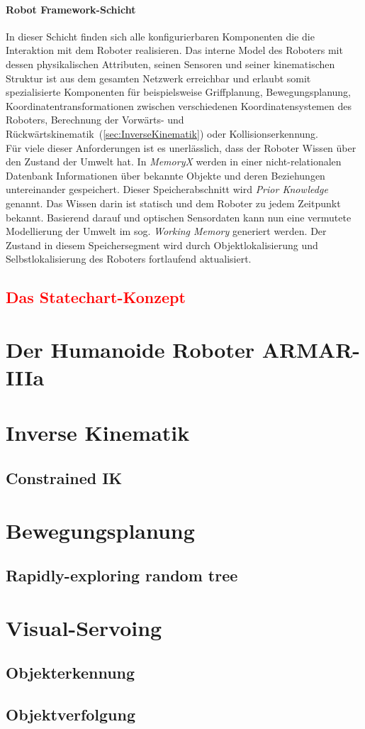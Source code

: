 \paragraph{\glqq Robot Framework\grqq -Schicht} In dieser Schicht finden sich alle konfigurierbaren Komponenten die die Interaktion mit dem Roboter realisieren. Das interne Model des Roboters mit dessen physikalischen Attributen, seinen Sensoren und seiner kinematischen Struktur ist aus dem gesamten Netzwerk erreichbar und erlaubt somit spezialisierte Komponenten für beispielsweise Griffplanung, Bewegungsplanung, Koordinatentransformationen zwischen verschiedenen Koordinatensystemen des Roboters, Berechnung der Vorwärts- und Rückwärtskinematik~(\autoref{sec:InverseKinematik}) oder Kollisionserkennung. \\
Für viele dieser Anforderungen ist es unerlässlich, dass der Roboter Wissen über den Zustand der Umwelt hat. In \textit{MemoryX} werden in einer nicht-relationalen Datenbank Informationen über bekannte Objekte und deren Beziehungen untereinander gespeichert. Dieser Speicherabschnitt wird \textit{Prior Knowledge} genannt. Das Wissen darin ist statisch und dem Roboter zu jedem Zeitpunkt bekannt. Basierend darauf und optischen Sensordaten kann nun eine vermutete Modellierung der Umwelt im sog. \textit{Working Memory} generiert werden. Der Zustand in diesem Speichersegment wird durch Objektlokalisierung und Selbstlokalisierung des Roboters fortlaufend aktualisiert. \\



\subsection{\textcolor{red}{Das Statechart-Konzept}}\label{sec:Statechart_concept}

\section{Der Humanoide Roboter ARMAR-IIIa}

\section{Inverse Kinematik}\label{sec:InverseKinematik}
\subsection{Constrained IK}\label{sec:ConstrainedIK}

\section{Bewegungsplanung} \label{sec:Bewegungsplanung}
\subsection{Rapidly-exploring random tree}

\section{Visual-Servoing}
\subsection{Objekterkennung}
\subsection{Objektverfolgung}